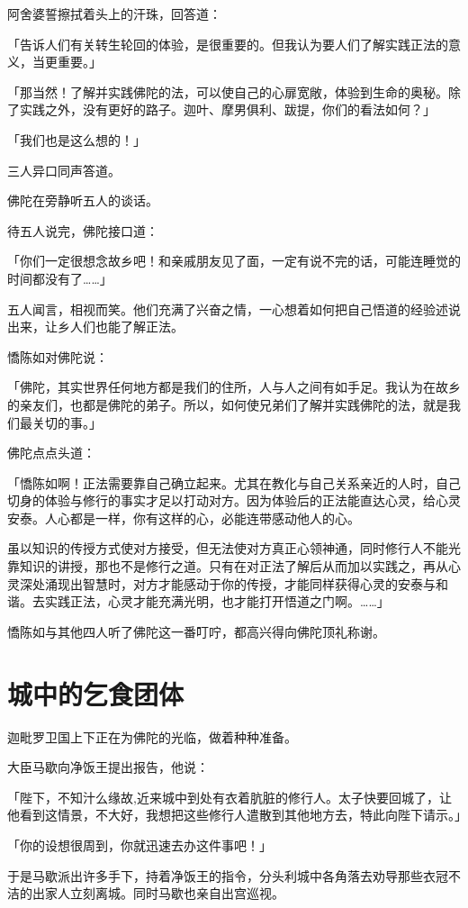 \documentclass[twoside,openany]{book}
\begin{document}
阿舍婆誓擦拭着头上的汗珠，回答道：

「告诉人们有关转生轮回的体验，是很重要的。但我认为要人们了解实践正法的意义，当更重要。」

「那当然！了解并实践佛陀的法，可以使自己的心扉宽敞，体验到生命的奥秘。除了实践之外，没有更好的路子。迦叶、摩男俱利、跋提，你们的看法如何？」 

「我们也是这么想的！」

三人异口同声答道。

佛陀在旁静听五人的谈话。

待五人说完，佛陀接口道：

「你们一定很想念故乡吧！和亲戚朋友见了面，一定有说不完的话，可能连睡觉的时间都没有了……」

五人闻言，相视而笑。他们充满了兴奋之情，一心想着如何把自己悟道的经验述说出来，让乡人们也能了解正法。

憍陈如对佛陀说：

「佛陀，其实世界任何地方都是我们的住所，人与人之间有如手足。我认为在故乡的亲友们，也都是佛陀的弟子。所以，如何使兄弟们了解并实践佛陀的法，就是我们最关切的事。」

佛陀点点头道：

「憍陈如啊！正法需要靠自己确立起来。尤其在教化与自己关系亲近的人时，自己切身的体验与修行的事实才足以打动对方。因为体验后的正法能直达心灵，给心灵安泰。人心都是一样，你有这样的心，必能连带感动他人的心。

虽以知识的传授方式使对方接受，但无法使对方真正心领神通，同时修行人不能光靠知识的讲授，那也不是修行之道。只有在对正法了解后从而加以实践之，再从心灵深处涌现出智慧时，对方才能感动于你的传授，才能同样获得心灵的安泰与和谐。去实践正法，心灵才能充满光明，也才能打开悟道之门啊。……」

憍陈如与其他四人听了佛陀这一番叮咛，都高兴得向佛陀顶礼称谢。

\section{城中的乞食团体}\label{sec8.2}

迦毗罗卫国上下正在为佛陀的光临，做着种种准备。

大臣马歇向净饭王提出报告，他说：

「陛下，不知汁么缘故,近来城中到处有衣着肮脏的修行人。太子快要回城了，让他看到这情景，不大好，我想把这些修行人遣散到其他地方去，特此向陛下请示。」

「你的设想很周到，你就迅速去办这件事吧！」

于是马歇派出许多手下，持着净饭王的指令，分头利城中各角落去劝导那些衣冠不洁的出家人立刻离城。同时马歇也亲自出宫巡视。
\end{document}
